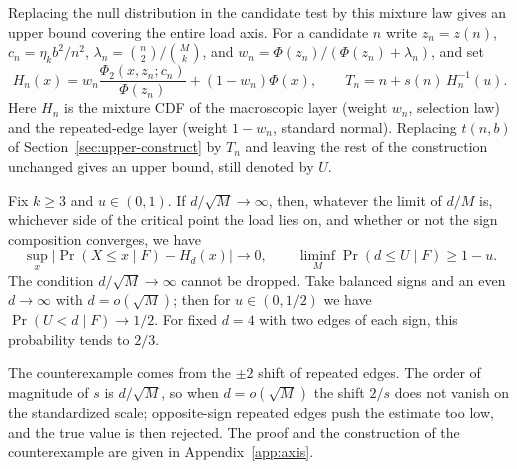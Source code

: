 Replacing the null distribution in the candidate test by this mixture law gives an upper bound covering the entire load
axis. For a candidate $n$ write $z_n = z(n)$, $c_n = \eta_k b^2/n^2$,
$\lambda_n = \binom{n}{2}/\binom{M}{k}$, and $w_n = \Phi(z_n)/(\Phi(z_n) + \lambda_n)$, and set
\begin{equation*}
H_n(x) = w_n\frac{\Phi_2(x,z_n;c_n)}{\Phi(z_n)} + (1-w_n)\Phi(x),\qquad
T_n = n + s(n)\,H_n^{-1}(u).
\end{equation*}
Here $H_n$ is the mixture CDF of the macroscopic layer (weight $w_n$, selection law) and the repeated-edge layer
(weight $1-w_n$, standard normal). Replacing $t(n,b)$ of Section~\ref{sec:upper-construct} by $T_n$ and leaving the
rest of the construction unchanged gives an upper bound, still denoted by $U$.

\begin{proposition}\label{prop:axis}
Fix $k \ge 3$ and $u \in (0,1)$. If $d/\sqrt{M} \to \infty$, then, whatever the limit of $d/M$ is, whichever side of
the critical point the load lies on, and whether or not the sign composition converges, we have
\begin{equation*}
\sup_x\bigl|\Pr(X \le x \mid F) - H_d(x)\bigr| \to 0,\qquad
\liminf_M \Pr(d \le U \mid F) \ge 1-u.
\end{equation*}
The condition $d/\sqrt{M} \to \infty$ cannot be dropped. Take balanced signs and an even $d \to \infty$ with
$d = o(\sqrt{M})$; then for $u \in (0,1/2)$ we have $\Pr(U < d \mid F) \to 1/2$. For fixed $d = 4$ with two edges of
each sign, this probability tends to $2/3$.
\end{proposition}
The counterexample comes from the $\pm 2$ shift of repeated edges. The order of magnitude of $s$ is $d/\sqrt{M}$, so
when $d = o(\sqrt{M})$ the shift $2/s$ does not vanish on the standardized scale; opposite-sign repeated edges push the
estimate too low, and the true value is then rejected. The proof and the construction of the counterexample are given in
Appendix~\ref{app:axis}.
